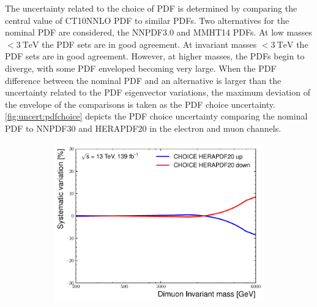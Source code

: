 The uncertainty related to the choice of PDF is determined by comparing the central value of CT10NNLO PDF to similar PDFs. Two alternatives for the nominal PDF are considered, the NNPDF3.0 and MMHT14 PDFs. At low masses $< \SI{3}{\tera\electronvolt}$ the PDF sets are in good agreement. At invariant masses $< \SI{3}{\tera\electronvolt}$ the PDF sets are in good agreement. However, at higher masses, the PDFs begin to diverge, with some PDF enveloped becoming very large. When the PDF difference between the nominal PDF and an alternative is larger than the uncertainty related to the PDF eigenvector variations, the maximum deviation of the envelope of the comparisons is taken as the PDF choice uncertainty. \cref{fig:uncert:pdfchoice} depicts the PDF choice uncertainty comparing the nominal PDF to NNPDF30 and HERAPDF20 in the electron and muon channels. 
\begin{figure}[h!]
    \centering
    \begin{subfigure}[b]{0.42\textwidth}
        \centering
        \includegraphics[width=\textwidth]{figures/analysis/datamc/Uncertainties/theory/mm/backgroundTemplate_KF_CHOICE_HERAPDF20.pdf}
        \label{fig:uncert:mmchoiceHERA}
    \end{subfigure}
    \begin{subfigure}[b]{0.42\textwidth}
        \centering

\end{subfigure}
\end{figure}
